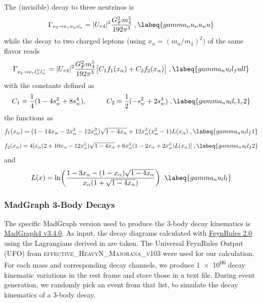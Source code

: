 The (invisible) decay to three neutrinos is
\begin{equation}
    \Gamma_{\nu_4 \rightarrow \nu_\tau \nu_\alpha \bar{\nu_\alpha}} = |U_{\tau4}|^2 \frac{G_F^2 m_4^5}{192\pi^3}
    \;,
    \labeq{gamma_nu_nu_nu}
\end{equation}
while the decay to two charged leptons (using $x_\alpha = (m_\alpha/m_4)^2)$ of the same flavor reads
\begin{equation}
    \Gamma_{\nu_4 \rightarrow \nu_\tau l_\alpha^+ l_\alpha^-} = |U_{\tau4}|^2 \frac{G_F^2 m_4^5}{192\pi^3} \big[ C_1 f_1(x_\alpha) + C_2 f_2(x_\alpha) \big]
    \;,
    \labeq{gamma_nu_ll_full}
\end{equation}
with the constants defined as
\begin{equation}
    C_1 = \frac{1}{4}(1-4s_w^2+8s_w^4) , \hspace{1cm} C_2 = \frac{1}{2}(-s_w^2+2s_w^4)
    \;,
    \labeq{gamma_nu_ll_c1_c2}
\end{equation} 
the functions as
\begin{equation}
    f_1(x_\alpha) = (1-14x_\alpha-2x_\alpha^2-12x_\alpha^3)\sqrt{1-4x_\alpha}+12x_\alpha^2(x_\alpha^2-1)L(x_\alpha)
    \;,
    \labeq{gamma_nu_ll_f1}
\end{equation}
\begin{equation}
    f_2(x_\alpha) = 4[x_\alpha(2+10x_\alpha-12x_\alpha^2)\sqrt{1-4x_\alpha}+6x_\alpha^2(1-2x_\alpha+2x_\alpha^2)L(x_\alpha)]
    \;,
    \labeq{gamma_nu_ll_f2}
\end{equation}
and
\begin{equation}
    L(x) = \ln \biggl( \frac{ 1-3x_\alpha-(1-x_\alpha)\sqrt{1-4x_\alpha} }{ x_\alpha(1+\sqrt{1-4x_\alpha}) } \biggr)
    \;.
    \labeq{gamma_nu_ll_l}
\end{equation}


\subsubsection{MadGraph 3-Body Decays} 

The specific MadGraph version used to produce the 3-body decay kinematics is \href{https://launchpad.net/mg5amcnlo/3.0/3.3.x}{MadGraph4 v3.4.0}. As input, the decay diagrams calculated with \href{http://feynrules.irmp.ucl.ac.be/#FeynRules2.0}{FeynRules 2.0} using the Lagrangians derived in  are taken. The Universal FeynRules Output (UFO) from \textsc{effective\_HeavyN\_Majorana\_v103} were used for our calculation. For each mass and corresponding decay channels, we produce \SI{1e06}{} decay kinematic variations in the rest frame and store those in a text file. During event generation, we randomly pick an event from that list, to simulate the decay kinematics of a 3-body decay.


